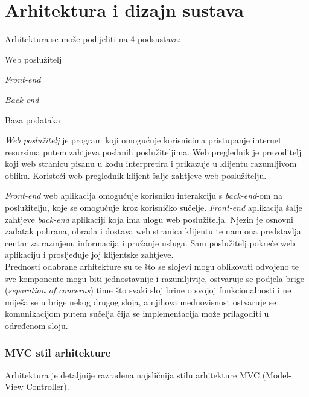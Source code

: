 \chapter{Arhitektura i dizajn sustava}
		
		Arhitektura se može podijeliti na 4 podsustava:
		\begin{packed_item}
		
			\item   Web poslužitelj
			\item   \textit{Front-end}
			\item 	\textit{Back-end}
			\item   Baza podataka
		\end{packed_item}
		
		
		\textit{Web poslužitelj} je program koji omogućuje korisnicima pristupanje internet resursima putem zahtjeva poslanih poslužiteljima. Web preglednik je prevoditelj koji web stranicu
pisanu u kodu interpretira i prikazuje u klijentu razumljivom obliku. Koristeći web preglednik
klijent šalje zahtjeve web poslužitelju.
		
		\textit{Front-end} web aplikacija omogućuje korisniku interakciju s \textit{back-end}-om na poslužitelju, koje se omogućuje kroz korisničko sučelje. 
		\textit{Front-end} aplikacija šalje zahtjeve \textit{back-end} aplikaciji koja ima ulogu web poslužitelja. Njezin je osnovni zadatak pohrana, obrada i dostava web stranica klijentu te nam ona predstavlja
centar za razmjenu informacija i pružanje usluga. Sam poslužitelj pokreće web aplikaciju i
prosljeđuje joj klijentske zahtjeve.\\

		Prednosti odabrane arhitekture su te što se slojevi mogu oblikovati odvojeno te sve
komponente mogu biti jednostavnije i razumljivije, ostvaruje se podjela brige (\textit{separation of
concerns}) time što svaki sloj brine o svojoj funkcionalnosti i ne miješa se u brige nekog
drugog sloja, a njihova međuovisnost ostvaruje se komunikacijom putem sučelja čija se
implementacija može prilagoditi u određenom sloju.\\

		\pagebreak

		\subsection{MVC stil arhitekture}
		Arhitektura	je	detaljnije	razrađena	najsličnija	stilu	arhitekture	MVC	(Model-View Controller).\\
		
